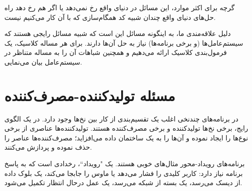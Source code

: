 \documentclass{book}
\begin{document}
    گرچه برای اکثر موارد، این مسائل در دنیای واقع رخ نمی‌دهد یا اگر هم رخ دهد راه حل‌های دنیای واقع چندان شبیه کد همگام‌سازی 
    که با آن کار می‌کنیم نیست. 

    دلیل علاقه‌مندی ما، به اینگونه مسائل این است که شبیه مسائل رایجی هستند که سیستم‌عامل‌ها  (و برخی برنامه‌ها) نیاز به حل آن‌ها دارند. 
    برای هر مساله کلاسیک، یک فرمول‌بندی کلاسیک ارائه می‌دهیم و همچنین شباهات آن را به مساله متناظر در سیستم‌عامل  بیان می‌نمایی. 

\section{مسئله تولیدکننده-مصرف‌کننده}

    در برنامه‌های چندنخی اغلب یک تقسیم‌بندی از کار بین نخ‌ها وجود دارد. در یک الگوی رایج، برخی نخ‌ها تولیدکننده و برخی مصرف‌کننده هستند. 
    تولیدکننده‌ها عناصری از برخی نوع‌ها را ایجاد نموده و آن‌ها را به یک ساختمان داده می‌افزاید؛ مصرف‌کننده‌ها عناصر را حذف نموده و پردازش می‌کنند.


    برنامه‌های رویداد-محور مثال‌های خوبی هستند. یک "رویداد``، رخدادی است که به پاسخ برنامه نیاز دارد: 
    کاربر کلیدی را فشار می‌دهد یا ماوس را جابجا می‌کند، یک بلوک داده از دیسک می‌رسد، یک بسته از شبکه می‌رسد، یک عمل در‌حال انتظار تکمیل می‌شود.
\end{document}
